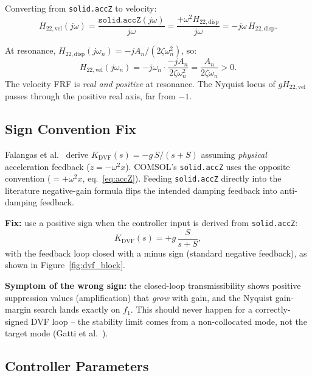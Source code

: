 \documentclass[12pt,a4paper]{article}
\begin{document}
Converting from \texttt{solid.accZ} to velocity:
\begin{equation}
  H_{22,\text{vel}}(j\omega)
  = \frac{\texttt{solid.accZ}(j\omega)}{j\omega}
  = \frac{+\omega^2 H_{22,\text{disp}}}{j\omega}
  = -j\omega\,H_{22,\text{disp}}.
  \label{eq:Hvel_comsol}
\end{equation}

At resonance, $H_{22,\text{disp}}(j\omega_n) = -jA_n/(2\zeta\omega_n^2)$, so:
\begin{equation}
  H_{22,\text{vel}}(j\omega_n)
  = -j\omega_n \cdot \frac{-jA_n}{2\zeta\omega_n^2}
  = \frac{A_n}{2\zeta\omega_n} > 0.
  \label{eq:Hvel_pos}
\end{equation}
The velocity FRF is \emph{real and positive} at resonance.  The Nyquist locus of
$g H_{22,\text{vel}}$ passes through the positive real axis, far from $-1$.

\subsection{Sign Convention Fix}
\label{sec:dvf_sign}

Falangas et al.~\cite{falangas1994} derive $K_\text{DVF}(s) = -g\,S/(s+S)$
assuming \emph{physical} acceleration feedback ($\ddot{z} = -\omega^2 x$).
COMSOL's \texttt{solid.accZ} uses the opposite convention
($= +\omega^2 x$, eq.~\eqref{eq:accZ}).  Feeding \texttt{solid.accZ} directly into
the literature negative-gain formula flips the intended damping feedback into
anti-damping feedback.

\textbf{Fix:} use a positive sign when the controller input is derived from
\texttt{solid.accZ}:
\begin{equation}
  \boxed{K_\text{DVF}(s) = +g\,\frac{S}{s+S}},
  \label{eq:Kdvf}
\end{equation}
with the feedback loop closed with a minus sign (standard negative feedback),
as shown in Figure~\ref{fig:dvf_block}.

\textbf{Symptom of the wrong sign:} the closed-loop transmissibility shows
positive suppression values (amplification) that \emph{grow} with gain, and the
Nyquist gain-margin search lands exactly on $f_1$.  This should never happen for
a correctly-signed DVF loop -- the stability limit comes from a non-collocated
mode, not the target mode (Gatti et al.~\cite{gatti2007}).

\subsection{Controller Parameters}
\label{sec:dvf_params}
\end{document}

